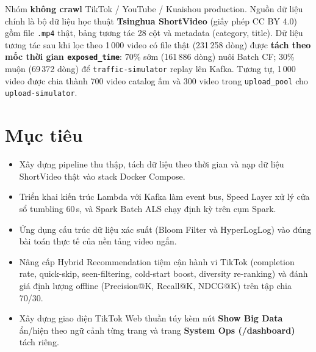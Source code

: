 Nhóm \textbf{không crawl} TikTok / YouTube / Kuaishou production. Nguồn dữ liệu chính là bộ dữ liệu học thuật \textbf{Tsinghua ShortVideo} (giấy phép CC BY 4.0) gồm file \texttt{.mp4} thật, bảng tương tác 28 cột và metadata (category, title). Dữ liệu tương tác sau khi lọc theo 1\,000 video có file thật (231\,258 dòng) được \textbf{tách theo mốc thời gian \texttt{exposed\_time}}: 70\% sớm (161\,886 dòng) nuôi Batch CF; 30\% muộn (69\,372 dòng) để \texttt{traffic-simulator} replay lên Kafka. Tương tự, 1\,000 video được chia thành 700 video catalog ấm và 300 video trong \texttt{upload\_pool} cho \texttt{upload-simulator}.

\section{Mục tiêu}

\begin{itemize}
  \item Xây dựng pipeline thu thập, tách dữ liệu theo thời gian và nạp dữ liệu ShortVideo thật vào stack Docker Compose.
  \item Triển khai kiến trúc Lambda với Kafka làm event bus, Speed Layer xử lý cửa sổ tumbling 60\,s, và Spark Batch ALS chạy định kỳ trên cụm Spark.
  \item Ứng dụng cấu trúc dữ liệu xác suất (Bloom Filter và HyperLogLog) vào đúng bài toán thực tế của nền tảng video ngắn.
  \item Nâng cấp Hybrid Recommendation tiệm cận hành vi TikTok (completion rate, quick-skip, seen-filtering, cold-start boost, diversity re-ranking) và đánh giá định lượng offline (Precision@K, Recall@K, NDCG@K) trên tập chia 70/30.
  \item Xây dựng giao diện TikTok Web thuần túy kèm nút \textbf{Show Big Data} ẩn/hiện theo ngữ cảnh từng trang và trang \textbf{System Ops (/dashboard)} tách riêng.
\end{itemize}
